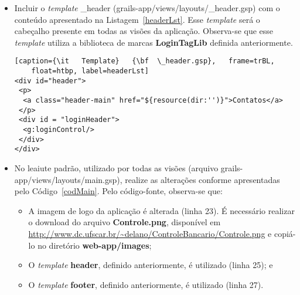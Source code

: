 \begin{itemize}
\lstset{language=XML}
\begin{lstlisting}[caption={\it   Template}   {\bf  \_footer.gsp},   frame=trBL,
    float=htbp, label=footerLst] 
<div id="footer">
 <hr/> &copy; DC - UFSCar
</div>
\end{lstlisting}

\item Incluir o  {\it template} \_header (grails-app/views/layouts/\_header.gsp)
  com o  conteúdo apresentado  na Listagem~\ref{headerLst}. Esse  {\it template}
  será o cabeçalho presente em todas as visões da aplicação. Observa-se que esse
  {\it  template} utiliza  a  biblioteca de  marcas  {\bf LoginTagLib}  definida
  anteriormente. 

\lstset{language=XML}
\begin{lstlisting}[caption={\it   Template}   {\bf  \_header.gsp},   frame=trBL,
    float=htbp, label=headerLst]
<div id="header">
 <p>
  <a class="header-main" href="${resource(dir:'')}">Contatos</a>
 </p>
 <div id = "loginHeader">
  <g:loginControl/>
 </div>
</div>
\end{lstlisting}

\newpage

\item    No     leaiute    padrão,    utilizado    por     todas    as    visões
  (arquivo  grails-app/views/layouts/main.gsp), realize  as  alterações conforme
  apresentadas pelo Código~\ref{codMain}.  Pelo código-fonte, observa-se que:

\begin{itemize}

\vspace{0.3cm}

\item A imagem de logo da aplicação é alterada (linha 23). É necessário realizar
  o    download     do    arquivo    {\bf     Controle.png},    disponível    em
  {\footnotesize\url{http://www.dc.ufscar.br/~delano/ControleBancario/Controle.png}}
  e copiá-lo no diretório {\bf web-app/images};

\vspace{0.3cm}

\item O {\it template} {\bf  header}, definido anteriormente, é utilizado (linha
  25); e 

\vspace{0.3cm}

\item O {\it template} {\bf  footer}, definido anteriormente, é utilizado (linha
  27). 


\end{itemize}
\end{itemize}

